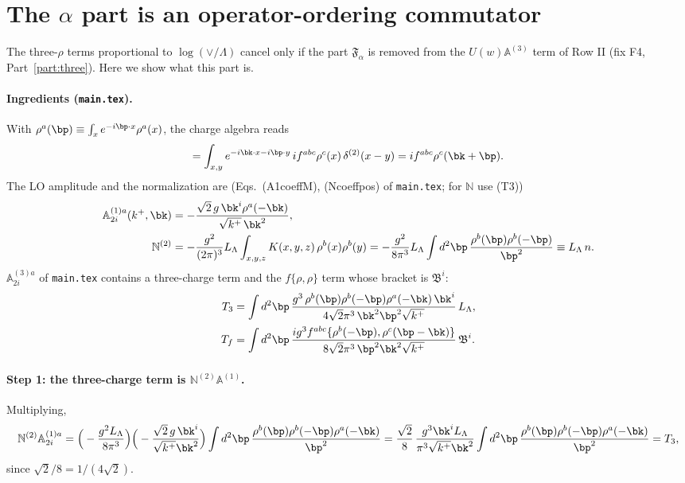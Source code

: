 \section{The \texorpdfstring{$\alpha$}{alpha} part is an operator-ordering commutator}\label{sec:alpha}
The three-$\rho$ terms proportional to $\log(\vee/\Lambda)$ cancel only if the part $\mathfrak F_\alpha$ is removed from the $U(w)\mathbb A^{(3)}$ term of Row II (fix F4, Part~\ref{part:three}). Here we show what this part is.

\paragraph{Ingredients (\texttt{main.tex}).} With $\rho^a(\bp)\equiv\int_xe^{-i\bp\cdot x}\rho^a(x)$, the charge algebra reads
\begin{equation}
[\rho^a(\bk),\rho^b(\bp)]=\int_{x,y}e^{-i\bk\cdot x-i\bp\cdot y}\,if^{abc}\rho^c(x)\,\delta^{(2)}(x-y)=if^{abc}\rho^c(\bk+\bp).
\label{eq:commk}
\end{equation}
The LO amplitude and the normalization are (Eqs.~(A1coeffM), (Ncoeffpos) of \texttt{main.tex}; for $\mathbb N$ use (T3))
\begin{align}
\mathbb A^{(1)a}_{2i}(k^+,\bk)&=-\frac{\sqrt2\,g\,\bk^i\rho^a(-\bk)}{\sqrt{k^+}\,\bk^2},\\
\mathbb N^{(2)}&=-\frac{g^2}{(2\pi)^3}L_\Lambda\int_{x,y,z}K(x,y,z)\,\rho^b(x)\rho^b(y)=-\frac{g^2}{8\pi^3}L_\Lambda\int d^2\bp\,\frac{\rho^b(\bp)\rho^b(-\bp)}{\bp^2}\equiv L_\Lambda\,n .
\end{align}
$\mathbb A^{(3)a}_{2i}$ of \texttt{main.tex} contains a three-charge term and the $f\{\rho,\rho\}$ term whose bracket is $\mathfrak B^i$:
\begin{align}
T_3&=\int d^2\bp\,\frac{g^3\,\rho^b(\bp)\rho^b(-\bp)\rho^a(-\bk)\,\bk^i}{4\sqrt2\pi^3\,\bk^2\bp^2\sqrt{k^+}}\,L_\Lambda,\\
T_f&=\int d^2\bp\,\frac{ig^3f^{abc}\{\rho^b(-\bp),\rho^c(\bp-\bk)\}}{8\sqrt2\pi^3\,\bp^2\bk^2\sqrt{k^+}}\,\mathfrak B^i .
\end{align}
\paragraph{Step 1: the three-charge term is $\mathbb N^{(2)}\mathbb A^{(1)}$.} Multiplying,
\begin{equation}
\mathbb N^{(2)}\mathbb A^{(1)a}_{2i}=\Big(-\frac{g^2L_\Lambda}{8\pi^3}\Big)\Big(-\frac{\sqrt2\,g\,\bk^i}{\sqrt{k^+}\bk^2}\Big)\int d^2\bp\,\frac{\rho^b(\bp)\rho^b(-\bp)\rho^a(-\bk)}{\bp^2}
=\frac{\sqrt2}{8}\,\frac{g^3\bk^iL_\Lambda}{\pi^3\sqrt{k^+}\bk^2}\int d^2\bp\,\frac{\rho^b(\bp)\rho^b(-\bp)\rho^a(-\bk)}{\bp^2}=T_3,
\end{equation}
since $\sqrt2/8=1/(4\sqrt2)$.
